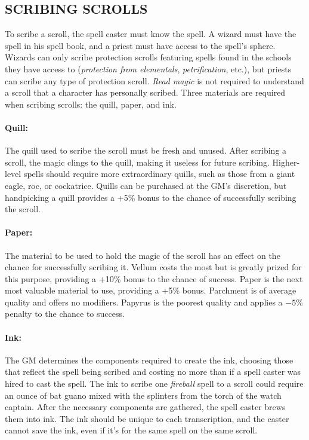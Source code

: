 \begin{multicols}{2}
 
\subsection{SCRIBING SCROLLS}

To scribe a scroll, the spell caster must know the spell.  A wizard must have the spell in his spell book, and a priest must have access to the spell's sphere.  Wizards can only scribe protection scrolls featuring spells found in the schools they have access to (\textit{protection from elementals}, \textit{petrification}, etc.), but priests can scribe any type of protection scroll.   \textit{Read magic} is not required to understand a scroll that a character has personally scribed.  Three materials are required when scribing scrolls: the quill, paper, and ink.

\paragraph{Quill:} The quill used to scribe the scroll must be fresh and unused.  After scribing a scroll, the magic clings to the quill, making it useless for future scribing.  Higher-level spells should require more extraordinary quills, such as those from a giant eagle, roc, or cockatrice.  Quills can be purchased at the GM's discretion, but handpicking a quill provides a +5\% bonus to the chance of successfully scribing the scroll.

\paragraph{Paper:} The material to be used to hold the magic of the scroll has an effect on the chance for successfully scribing it.  Vellum costs the most but is greatly prized for this purpose, providing a +10\% bonus to the chance of success.  Paper is the next most valuable material to use, providing a +5\% bonus.  Parchment is of average quality and offers no modifiers.  Papyrus is the poorest quality and applies a $-5$\% penalty to the chance to success.

\paragraph{Ink:} The GM determines the components required to create the ink, choosing those that reflect the spell being scribed and costing no more than if a spell caster was hired to cast the spell.  The ink to scribe one \textit{fireball} spell to a scroll could require an ounce of bat guano mixed with the splinters from the torch of the watch captain.  After the necessary components are gathered, the spell caster brews them into ink.  The ink should be unique to each transcription, and the caster cannot save the ink, even if it's for the same spell on the same scroll.
 

\end{multicols}

